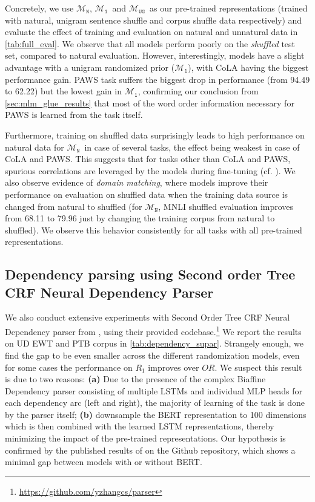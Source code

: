 \documentclass[letterpaper, 12pt]{report}
\newcommand{\OR}{$\mathcal{M}_{\texttt{N}}$}
\newcommand{\RI}{$\mathcal{M}_{\texttt{1}}$}
\newcommand{\RC}{$\mathcal{M}_{\texttt{UG}}$}
\begin{document}
Concretely, we use \OR, \RI\ and \RC\ as our pre-trained representations (trained with natural, unigram sentence shuffle and corpus shuffle data respectively) and evaluate the effect of training and evaluation on natural and unnatural data in \autoref{tab:full_eval}.
We observe that all models perform poorly on the \textit{shuffled} test set, compared to natural evaluation. However, interestingly, models have a slight advantage with a unigram randomized prior (\RI), with CoLA having the biggest performance gain.  PAWS task suffers the biggest drop in performance (from 94.49 to 62.22) but the lowest gain in \RI, confirming our conclusion from \autoref{sec:mlm_glue_results} that most of the word order information necessary for PAWS is learned from the task itself.

Furthermore, training on shuffled data surprisingly leads to high performance on natural data for \OR\ in case of several tasks, the effect being weakest in case of CoLA and PAWS. This suggests that for tasks other than CoLA and PAWS, spurious correlations are leveraged by the models during fine-tuning (cf. \citealt{gururangan-etal-2018-annotation, poliak-etal-2018-hypothesis,tsuchiya-2018-performance}). We also observe evidence of \textit{domain matching}, where models improve their performance on evaluation on shuffled data when the training data source is changed from natural to shuffled (for \OR, MNLI shuffled evaluation improves from 68.11 to 79.96 just by changing the training corpus from natural to shuffled). We observe this behavior consistently for all tasks with all pre-trained representations.

\subsection{Dependency parsing using Second order Tree CRF Neural Dependency Parser}
\label{sec:mlm_sota_dep}



We also conduct extensive experiments with Second Order Tree CRF Neural Dependency parser from \citet{zhang-etal-2020-efficient}, using their provided codebase.\footnote{\href{https://github.com/yzhangcs/parser}{https://github.com/yzhangcs/parser}} We report the results on UD EWT and PTB corpus in \autoref{tab:dependency_supar}. Strangely enough, we find the gap to be even smaller across the different randomization models, even for some cases the performance on $R_1$ improves over $OR$. We suspect this result is due to two reasons: \textbf{(a)} Due to the presence of the complex Biaffine Dependency parser consisting of multiple LSTMs and individual MLP heads for each dependency arc (left and right), the majority of learning of the task is done by the parser itself; \textbf{(b)} \citet{zhang-etal-2020-efficient} downsample the BERT representation to 100 dimensions which is then combined with the learned LSTM representations, thereby minimizing the impact of the pre-trained representations. Our hypothesis is confirmed by the published results of \citet{zhang-etal-2020-efficient} on the Github repository, which shows a minimal gap between models with or without BERT.
\end{document}
